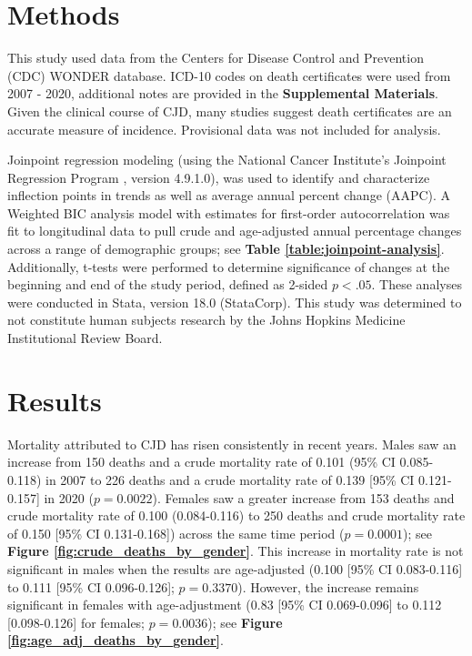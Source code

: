\documentclass[12pt]{article}
\begin{document}
\section*{Methods}

\par \bigskip

\noindent This study used data from the Centers for Disease Control and Prevention (CDC) WONDER database\cite{CDCWonder}. ICD-10 codes on death certificates were used from 2007 - 2020, additional notes are provided in the \textbf{Supplemental Materials}. Given the clinical course of CJD, many studies suggest death certificates are an accurate measure of incidence\cite{NeuroEpi}. Provisional data was not included for analysis. 

\par \bigskip

\noindent Joinpoint regression modeling (using the National Cancer Institute’s Joinpoint Regression Program \cite{StatMed, Joinpoint}, version 4.9.1.0), was used to identify and characterize inflection points in trends as well as average annual percent change (AAPC). A Weighted BIC analysis model with estimates for first-order autocorrelation was fit to longitudinal data to pull crude and age-adjusted annual percentage changes across a range of demographic groups; see \textbf{Table \ref{table:joinpoint-analysis}}. Additionally, t-tests were performed to determine significance of changes at the beginning and end of the study period, defined as 2-sided $p < .05$. These analyses were conducted in Stata, version 18.0 (StataCorp). This study was determined to not constitute human subjects research by the Johns Hopkins Medicine Institutional Review Board.

\newpage

\section*{Results}

Mortality attributed to CJD has risen consistently in recent years. Males saw an increase from 150 deaths and a crude mortality rate of 0.101 (95\% CI 0.085-0.118) in 2007 to 226 deaths and a crude mortality rate of 0.139 [95\% CI 0.121-0.157] in 2020 ($p = 0.0022$). Females saw a greater increase from 153 deaths and crude mortality rate of 0.100 (0.084-0.116) to 250 deaths and crude mortality rate of 0.150 [95\% CI 0.131-0.168]) across the same time period ($p = 0.0001$); see \textbf{Figure \ref{fig:crude_deaths_by_gender}}. This increase in mortality rate is not significant in males when the results are age-adjusted (0.100 [95\% CI 0.083-0.116] to 0.111 [95\% CI 0.096-0.126]; $p = 0.3370$). However, the increase remains significant in females with age-adjustment (0.83 [95\% CI 0.069-0.096] to 0.112 [0.098-0.126] for females; $p = 0.0036$); see \textbf{Figure \ref{fig:age_adj_deaths_by_gender}}. 
\end{document}

